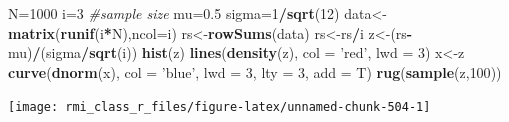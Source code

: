\documentclass[]{book}
\newenvironment{Shaded}{\begin{snugshade}}{\end{snugshade}}
\newcommand{\CommentTok}[1]{\textcolor[rgb]{0.56,0.35,0.01}{\textit{#1}}}
\newcommand{\DataTypeTok}[1]{\textcolor[rgb]{0.13,0.29,0.53}{#1}}
\newcommand{\DecValTok}[1]{\textcolor[rgb]{0.00,0.00,0.81}{#1}}
\newcommand{\FloatTok}[1]{\textcolor[rgb]{0.00,0.00,0.81}{#1}}
\newcommand{\KeywordTok}[1]{\textcolor[rgb]{0.13,0.29,0.53}{\textbf{#1}}}
\newcommand{\NormalTok}[1]{#1}
\newcommand{\OperatorTok}[1]{\textcolor[rgb]{0.81,0.36,0.00}{\textbf{#1}}}
\newcommand{\StringTok}[1]{\textcolor[rgb]{0.31,0.60,0.02}{#1}}
\theoremstyle{definition}
\theoremstyle{definition}
\theoremstyle{definition}
\theoremstyle{remark}
\begin{document}
\begin{Shaded}
\begin{Highlighting}[]
\NormalTok{N=}\DecValTok{1000} 
\NormalTok{i=}\DecValTok{3} \CommentTok{#sample size}
\NormalTok{mu=}\FloatTok{0.5}
\NormalTok{sigma=}\DecValTok{1}\OperatorTok{/}\KeywordTok{sqrt}\NormalTok{(}\DecValTok{12}\NormalTok{)}
\NormalTok{data<-}\KeywordTok{matrix}\NormalTok{(}\KeywordTok{runif}\NormalTok{(i}\OperatorTok{*}\NormalTok{N),}\DataTypeTok{ncol=}\NormalTok{i)}
\NormalTok{rs<-}\KeywordTok{rowSums}\NormalTok{(data)}
\NormalTok{rs<-rs}\OperatorTok{/}\NormalTok{i}
\NormalTok{z<-(rs}\OperatorTok{-}\NormalTok{mu)}\OperatorTok{/}\NormalTok{(sigma}\OperatorTok{/}\KeywordTok{sqrt}\NormalTok{(i))}
\KeywordTok{hist}\NormalTok{(z)}
\KeywordTok{lines}\NormalTok{(}\KeywordTok{density}\NormalTok{(z), }\DataTypeTok{col =} \StringTok{'red'}\NormalTok{, }\DataTypeTok{lwd =} \DecValTok{3}\NormalTok{)}
\NormalTok{x<-z}
\KeywordTok{curve}\NormalTok{(}\KeywordTok{dnorm}\NormalTok{(x), }\DataTypeTok{col =} \StringTok{'blue'}\NormalTok{, }\DataTypeTok{lwd =} \DecValTok{3}\NormalTok{, }\DataTypeTok{lty =} \DecValTok{3}\NormalTok{, }\DataTypeTok{add =}\NormalTok{ T)}
\KeywordTok{rug}\NormalTok{(}\KeywordTok{sample}\NormalTok{(z,}\DecValTok{100}\NormalTok{))}
\end{Highlighting}
\end{Shaded}

\begin{center}\texttt{[image: rmi\_class\_r\_files/figure-latex/unnamed-chunk-504-1]} \end{center}
\end{document}
